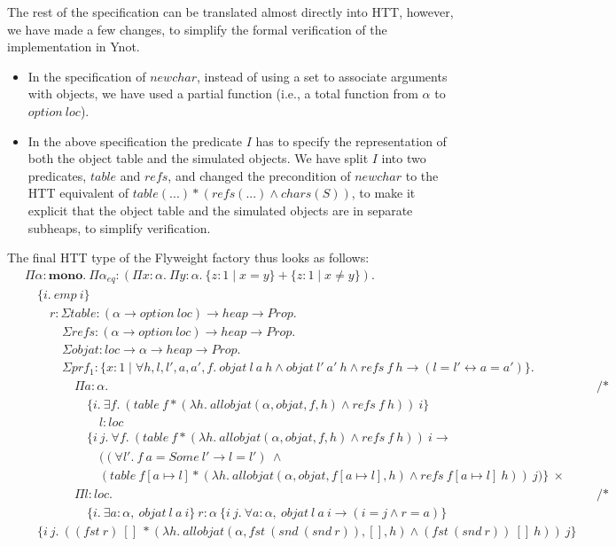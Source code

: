 \documentclass[a4paper,english]{article}
\newcommand{\HEAP}[0]{heap}
\newcommand{\PROP}[0]{Prop}
\newcommand{\MONO}[0]{\mathbf{mono}}
\newcommand{\LOC}[0]{loc}
\newcommand{\OPTION}[0]{option}
\newcommand{\pname}[1]{\texttt{/* #1 */}}
\begin{document}
The rest of the specification can be translated almost directly into HTT,
however, we have made a few changes, to simplify the formal verification of the
implementation in Ynot. 
\begin{itemize}
\item In the specification of $newchar$, instead of using a set to associate
arguments with objects, we have used a partial function (i.e., a total function
from $\alpha$ to $\OPTION\ \LOC$).
\item In the above specification the predicate $I$ has to specify the
representation of both the object table and the simulated objects. We have
split $I$ into two predicates, $table$ and $refs$, and changed the precondition
of $newchar$ to the HTT equivalent of $table(...) * (refs(...) \land
chars(S))$, to make it explicit that the object table and the simulated objects
are in separate subheaps, to simplify verification.
\end{itemize}
The final HTT type of the Flyweight factory thus looks as follows:
\begin{align*}
&\Pi \alpha : \MONO.\ \Pi \alpha_{eq} : (\Pi x : \alpha.\ \Pi y : \alpha.\ \{ z : 1 \mid x = y \} + \{ z : 1 \mid x \neq y \}).\\
&\quad\{ i.\ emp\ i \}\\
&\quad\quad r : \Sigma table : (\alpha \rightarrow \OPTION\ \LOC) \rightarrow \HEAP \rightarrow \PROP.\\
&\quad\quad\quad \Sigma refs : (\alpha \rightarrow \OPTION\ \LOC) \rightarrow \HEAP \rightarrow \PROP.\\
&\quad\quad\quad \Sigma objat : \LOC \rightarrow \alpha \rightarrow \HEAP \rightarrow \PROP.\\
&\quad\quad\quad\Sigma prf_1 : \{ x : 1 \mid \forall h, l, l', a, a', f.\ objat\ l\ a\ h \land objat\ l'\ a'\ h \land refs\ f\ h \rightarrow (l = l' \leftrightarrow a = a') \}.\\
&\quad\quad\quad\quad \Pi a : \alpha. && \pname{new}\\
&\quad\quad\quad\quad\quad \{ i.\ \exists f.\ (table\ f * (\lambda h.\ allobjat(\alpha, objat, f, h) \land refs\ f\ h))\ i \}\\
&\quad\quad\quad\quad\quad\quad l : \LOC\\
&\quad\quad\quad\quad\quad \{ i\ j.\ \forall f.\ (table\ f * (\lambda h.\ allobjat(\alpha, objat, f, h) \land refs\ f\ h))\ i \rightarrow\\
&\quad\quad\quad\quad\quad\quad ((\forall l'.\ f\ a = Some\ l' \rightarrow l = l')\ \land\\
&\quad\quad\quad\quad\quad\quad (table\ f[a \mapsto l] * (\lambda h.\ allobjat(\alpha, objat, f[a \mapsto l], h) \land refs\ f[a \mapsto l]\ h))\ j) \}\ \times\\
&\quad\quad\quad\quad \Pi l : loc. && \pname{get}\\
&\quad\quad\quad\quad\quad \{ i.\ \exists a : \alpha,\ objat\ l\ a\ i \}\ r : \alpha\ \{ i\ j.\ \forall a : \alpha,\ objat\ l\ a\ i \rightarrow (i = j \land r = a) \}\\\
&\quad \{ i\ j.\ ((fst\ r)\ []\ * (\lambda h.\ allobjat(\alpha, fst\ (snd\ (snd\ r)), [], h) \land (fst\ (snd\ r))\ []\ h))\ j \}
\end{align*}
\end{document}
